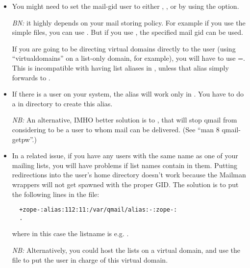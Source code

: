 \documentclass{howto}
\begin{document}
\begin{itemize}
\item You might need to set the mail-gid user to either ,
      , or  by using the
        option.

      \emph{BN:} it highly depends on your mail storing policy.  For example
      if you use the simple  files, you can use
      .  But if you use , the
      specified mail gid can be used.

      If you are going to be directing virtual domains directly to the
       user (using ``virtualdomains'' on a list-only domain, for
      example), you will have to use =.  This is incompatible with having list aliases
      in , unless that alias simply forwards to
      .

\item If there is a user  on your system, the alias
       will work only in .  You have to do
      a  in  directory to create
      this alias.

      \emph{NB:} An alternative, IMHO better solution is to , that will stop qmail from considering  to
      be a user to whom mail can be delivered.  (See ``man 8 qmail-getpw''.)

\item In a related issue, if you have any users with the same name as one of
      your mailing lists, you will have problems if list names contain
      \samp{-} in them.  Putting  redirections into the user's
      home directory doesn't work because the Mailman wrappers will not get
      spawned with the proper GID.  The solution is to put the following lines
      in the  file:

\begin{verbatim}
  +zope-:alias:112:11:/var/qmail/alias:-:zope-:
  .
\end{verbatim}

      where in this case the listname is e.g. .

      \emph{NB:} Alternatively, you could host the lists on a virtual domain,
      and use the  file to put the
       user in charge of this virtual domain.


\end{itemize}
\end{document}
